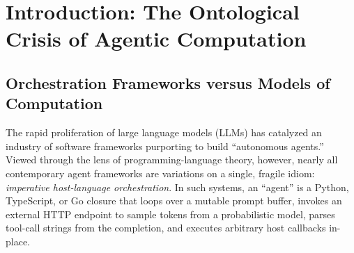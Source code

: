 \documentclass[11pt,a4paper]{article}
\theoremstyle{definition}
\theoremstyle{remark}
\begin{document}
\begin{abstract}
Synthesizing these five pillars, we present four groups of definitions, arguments and implementation evidence, with general congruence and dependent recovery simulations retained as open obligations: (1)~the relative macro-expressiveness of supervision, coordination, and bounded snapshot-cursor iteration ($\Lambda_{\text{ALAN}}$); (2)~a syntactic bimorphism lowering high-level interactions into standard Interaction Trees over a split-phase signature $E_{\text{split}} = \mathsf{Emit} \uplus \mathsf{Receive}$, paired with a novel \emph{Split-Phase Journaled Handler Algebra} ($\mathcal{H}_{\text{journal}}$) with a proposition-indexed evidence order represented by the four-stage consistent epistemic poset $\mathbb{O}_{\text{eff}}^{\text{cons}} = \{\bot_{\text{unauth}}, \mathsf{Suppressed}(r), \mathsf{Unknown}, \mathsf{Known}(v)\}$ completed by an improper fault element $\top_{\text{conflict}}$ into a five-kind bounded lattice $\widehat{\mathbb{O}}_{\text{eff}}$; (3)~the orthogonality of provenance, communication, and lifecycle authority graphs ($\mathcal{G}_{\text{prov}} \perp \mathcal{G}_{\text{comm}} \perp \mathcal{G}_{\text{life}}$) and a proposed, unproved general congruence claim for budget-indexed, interface-scoped failure/divergence bisimulation ($\approx^{\Delta}_{I,\mathcal{B}}$) preserving dual mailbox-admission and continuation-consumption refusals; and (4)~an indistinguishability argument for unconditional crash bisimulation across unreconciled non-idempotent in-flight effects, leading to the \emph{Two-Regime Fundamental Theorem of Durable Interactive Recovery}, which separates retained-state and conservative-uncertainty safety from proposed symmetric and directed future simulations. Peer interference, resource/closure stability, endpoint coupling and scheduling require additional arguments; retry expenditure and external effects cannot be hidden to restore equivalence.
\end{abstract}

\tableofcontents
\newpage

\section{Introduction: The Ontological Crisis of Agentic Computation}

\subsection{Orchestration Frameworks versus Models of Computation}
The rapid proliferation of large language models (LLMs) has catalyzed an industry of software frameworks purporting to build ``autonomous agents.'' Viewed through the lens of programming-language theory, however, nearly all contemporary agent frameworks are variations on a single, fragile idiom: \emph{imperative host-language orchestration}. In such systems, an ``agent'' is a Python, TypeScript, or Go closure that loops over a mutable prompt buffer, invokes an external HTTP endpoint to sample tokens from a probabilistic model, parses tool-call strings from the completion, and executes arbitrary host callbacks in-place.
\end{document}
